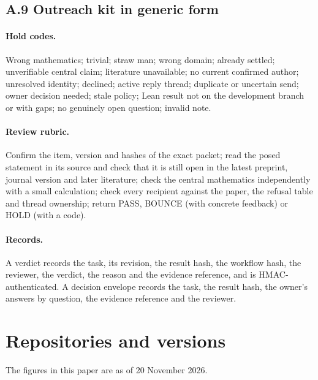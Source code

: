 \documentclass[11pt]{article}
\begin{document}
\subsection*{A.9 Outreach kit in generic form}
\paragraph{Hold codes.} Wrong mathematics; trivial; straw man; wrong domain;
already settled; unverifiable central claim; literature unavailable; no
current confirmed author; unresolved identity; declined; active reply
thread; duplicate or uncertain send; owner decision needed; stale policy;
Lean result not on the development branch or with gaps; no genuinely open
question; invalid note.

\paragraph{Review rubric.} Confirm the item, version and hashes of the exact
packet; read the posed statement in its source and check that it is still
open in the latest preprint, journal version and later literature; check the
central mathematics independently with a small calculation; check every
recipient against the paper, the refusal table and thread ownership; return
PASS, BOUNCE (with concrete feedback) or HOLD (with a code).

\paragraph{Records.} A verdict records the task, its revision, the result
hash, the workflow hash, the reviewer, the verdict, the reason and the
evidence reference, and is HMAC-authenticated. A decision envelope records
the task, the result hash, the owner's answers by question, the evidence
reference and the reviewer.

\section{Repositories and versions}
\label{app:repro}
The figures in this paper are as of 20 November 2026.
\end{document}
